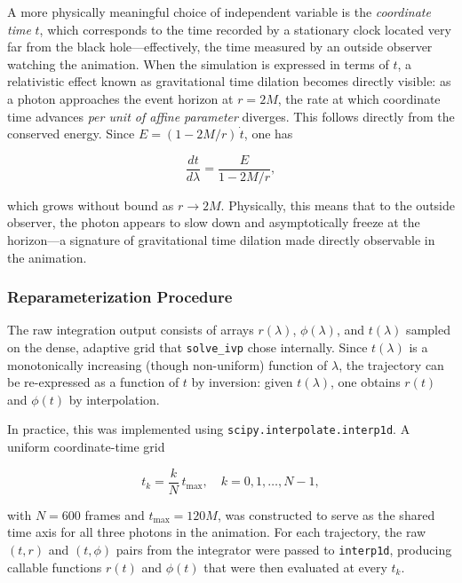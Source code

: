 \documentclass[12pt,a4paper]{article}
\begin{document}
A more physically meaningful choice of independent variable is the \textit{coordinate time} $t$, which corresponds to the time recorded by a stationary clock located very far from the black hole---effectively, the time measured by an outside observer watching the animation. When the simulation is expressed in terms of $t$, a relativistic effect known as gravitational time dilation becomes directly visible: as a photon approaches the event horizon at $r = 2M$, the rate at which coordinate time advances \textit{per unit of affine parameter} diverges. This follows directly from the conserved energy. Since $E = (1 - 2M/r)\,\dot{t}$, one has

\begin{equation}
    \frac{dt}{d\lambda} = \frac{E}{1 - 2M/r},
\end{equation}

\noindent which grows without bound as $r \to 2M$. Physically, this means that to the outside observer, the photon appears to slow down and asymptotically freeze at the horizon---a signature of gravitational time dilation made directly observable in the animation.

\subsubsection{Reparameterization Procedure}
The raw integration output consists of arrays $r(\lambda)$, $\phi(\lambda)$, and $t(\lambda)$ sampled on the dense, adaptive grid that \texttt{solve\_ivp} chose internally. Since $t(\lambda)$ is a monotonically increasing (though non-uniform) function of $\lambda$, the trajectory can be re-expressed as a function of $t$ by inversion: given $t(\lambda)$, one obtains $r(t)$ and $\phi(t)$ by interpolation.

In practice, this was implemented using \texttt{scipy.interpolate.interp1d}. A uniform coordinate-time grid

\begin{equation}
    t_k = \frac{k}{N} \, t_{\max}, \quad k = 0, 1, \ldots, N-1,
\end{equation}

\noindent with $N = 600$ frames and $t_{\max} = 120M$, was constructed to serve as the shared time axis for all three photons in the animation. For each trajectory, the raw $(t, r)$ and $(t, \phi)$ pairs from the integrator were passed to \texttt{interp1d}, producing callable functions $r(t)$ and $\phi(t)$ that were then evaluated at every $t_k$.
\end{document}
